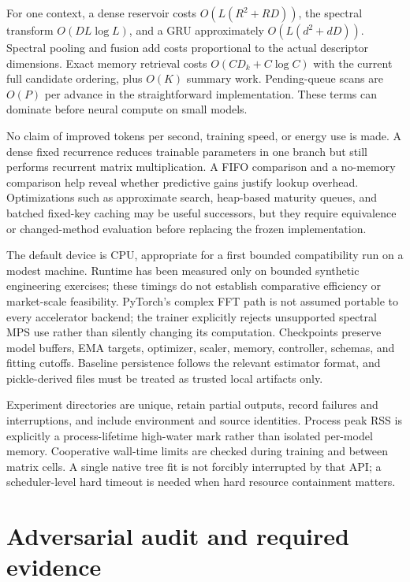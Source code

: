 \documentclass[11pt,a4paper]{article}
\begin{document}
For one context, a dense reservoir costs $O(L(R^2+RD))$, the spectral transform $O(DL\log L)$, and a GRU approximately $O(L(d^2+dD))$. Spectral pooling and fusion add costs proportional to the actual descriptor dimensions. Exact memory retrieval costs $O(CD_k+C\log C)$ with the current full candidate ordering, plus $O(K)$ summary work. Pending-queue scans are $O(P)$ per advance in the straightforward implementation. These terms can dominate before neural compute on small models.

No claim of improved tokens per second, training speed, or energy use is made. A dense fixed recurrence reduces trainable parameters in one branch but still performs recurrent matrix multiplication. A FIFO comparison and a no-memory comparison help reveal whether predictive gains justify lookup overhead. Optimizations such as approximate search, heap-based maturity queues, and batched fixed-key caching may be useful successors, but they require equivalence or changed-method evaluation before replacing the frozen implementation.

The default device is CPU, appropriate for a first bounded compatibility run on a modest machine. Runtime has been measured only on bounded synthetic engineering exercises; these timings do not establish comparative efficiency or market-scale feasibility. PyTorch's complex FFT path is not assumed portable to every accelerator backend; the trainer explicitly rejects unsupported spectral MPS use rather than silently changing its computation. Checkpoints preserve model buffers, EMA targets, optimizer, scaler, memory, controller, schemas, and fitting cutoffs. Baseline persistence follows the relevant estimator format, and pickle-derived files must be treated as trusted local artifacts only.

Experiment directories are unique, retain partial outputs, record failures and interruptions, and include environment and source identities. Process peak RSS is explicitly a process-lifetime high-water mark rather than isolated per-model memory. Cooperative wall-time limits are checked during training and between matrix cells. A single native tree fit is not forcibly interrupted by that API; a scheduler-level hard timeout is needed when hard resource containment matters.

\section{Adversarial audit and required evidence}
\end{document}
